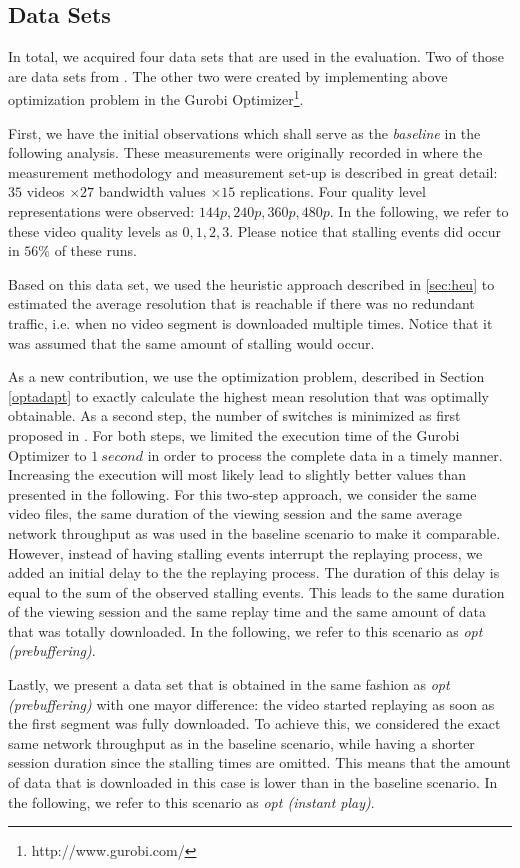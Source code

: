 
\subsection{Data Sets}

In total, we acquired four data sets that are used in the evaluation. Two of those are data sets from \cite{sieber16sacrificing}. The other two were created by implementing above optimization problem in the Gurobi Optimizer\footnote{http://www.gurobi.com/}.

First, we have the initial observations which shall serve as the \textit{baseline} in the following analysis. These measurements were originally recorded in \cite{sieber16sacrificing} where the measurement methodology and measurement set-up is described in great detail: $35$ videos $\times 27$ bandwidth values $\times 15$ replications. Four quality level representations were observed: $144p, 240p, 360p, 480p$. In the following, we refer to these video quality levels as $0,1,2,3$. Please notice that stalling events did occur in $56\%$ of these runs.

Based on this data set, we used the heuristic approach described in \ref{sec:heu} to estimated the average resolution that is reachable if there was no redundant traffic, i.e. when no video segment is downloaded multiple times. Notice that it was assumed that the same amount of stalling would occur.

As a new contribution, we use the optimization problem, described in Section \ref{optadapt} to exactly calculate the highest mean resolution that was optimally obtainable. As a second step, the number of switches is minimized as first proposed in \cite{miller2013optimal}. For both steps, we limited the execution time of the Gurobi Optimizer to $\SI{1}{second}$ in order to process the complete data in a timely manner. Increasing the execution will most likely lead to slightly better values than presented in the following. For this two-step approach, we consider the same video files, the same duration of the viewing session and the same average network throughput as was used in the baseline scenario to make it comparable. However, instead of having stalling events interrupt the replaying process, we added an initial delay to the the replaying process. The duration of this delay is equal to the sum of the observed stalling events. This leads to the same duration of the viewing session and the same replay time and the same amount of data that was totally downloaded. In the following, we refer to this scenario as \textit{opt (prebuffering)}.

Lastly, we present a data set that is obtained in the same fashion as \textit{opt (prebuffering)} with one mayor difference: the video started replaying as soon as the first segment was fully downloaded. To achieve this, we considered the exact same network throughput as in the baseline scenario, while having a shorter session duration since the stalling times are omitted. This means that the amount of data that is downloaded in this case is lower than in the baseline scenario. In the following, we refer to this scenario as \textit{opt (instant play)}.
